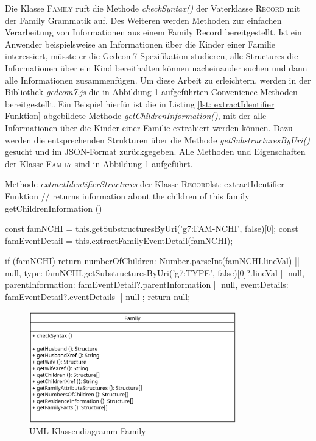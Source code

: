 Die Klasse \textsc{Family} ruft die Methode \textit{checkSyntax()} der Vaterklasse \textsc{Record} mit der Family Grammatik auf. Des Weiteren werden Methoden zur einfachen Verarbeitung von Informationen aus einem Family Record bereitgestellt. Ist ein Anwender beispielsweise an Informationen über die Kinder einer Familie interessiert, müsste er die Gedcom7 Spezifikation studieren, alle Structures die Informationen über ein Kind bereithalten können nacheinander suchen und dann alle Informationen zusammenfügen. Um diese Arbeit zu erleichtern, werden in der Bibliothek \textit{gedcom7.js} die in Abbildung \ref{fig: UML Klassendiagramm Family} aufgeführten Convenience-Methoden bereitgestellt. Ein Beispiel hierfür ist die in Listing \ref{lst: extractIdentifier Funktion} abgebildete Methode \textit{getChildrenInformation()}, mit der alle Informationen über die Kinder einer Familie extrahiert werden können. Dazu werden die entsprechenden Strukturen über die Methode \textit{getSubstructuresByUri()} gesucht und im JSON-Format zurückgegeben. Alle Methoden und Eigenschaften der Klasse \textsc{Family} sind in Abbildung \ref{fig: UML Klassendiagramm Family} aufgeführt.
\vspace{1em}
\begin{javascript}{Methode \textit{extractIdentifierStructures} der Klasse \textsc{Record}}{lst: extractIdentifier Funktion}
	// returns information about the children of this family
	getChildrenInformation () {
		const famNCHI = this.getSubstructuresByUri('g7:FAM-NCHI', false)[0];
		const famEventDetail = this.extractFamilyEventDetail(famNCHI);
		
		if (famNCHI) {
			return {
				numberOfChildren: Number.parseInt(famNCHI.lineVal) || null,
				type: famNCHI.getSubstructuresByUri('g7:TYPE', false)[0]?.lineVal || null,
				parentInformation: famEventDetail?.parentInformation || null,
				eventDetails: famEventDetail?.eventDetails || null
			};
		}
		return null;
	}
\end{javascript}

\begin{figure}[h]
	\centering
	\includegraphics[width=0.8\textwidth]{images/UML_Class_Family.png}
	\caption{UML Klassendiagramm Family}
	\label{fig: UML Klassendiagramm Family}
\end{figure}
\newpage
